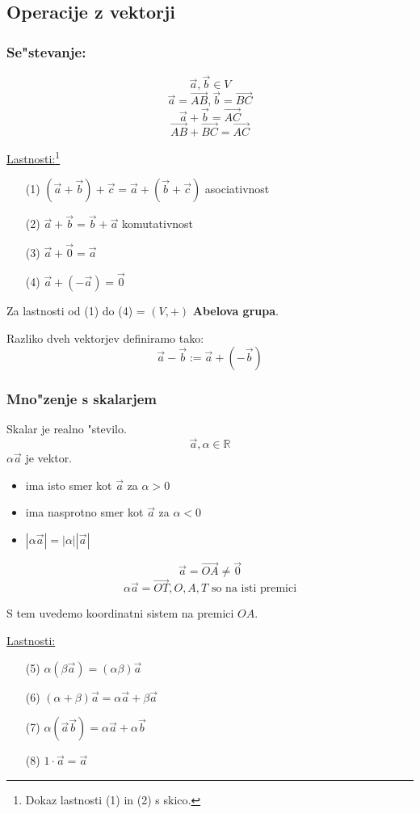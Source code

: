\subsection{Operacije z vektorji}
\subsubsection*{Se"stevanje:}
\[\vec{a}, \vec{b} \in V\]
\[\vec{a} = \vec{AB}, \vec{b} = \vec{BC}\]
\[\vec{a} + \vec{b} = \vec{AC}\]
\[\vec{AB} + \vec{BC} = \vec{AC}\]

\underline{Lastnosti:}\footnote{Dokaz lastnosti (1) in (2) s skico.}
\begin{itemize}
	\item[(1)] \((\vec{a} + \vec{b}) + \vec{c} = \vec{a} + (\vec{b} + \vec{c})\) asociativnost
	\item[(2)] \(\vec{a} + \vec{b} = \vec{b} + \vec{a}\) komutativnost
	\item[(3)] \(\vec{a} + \vec{0} = \vec{a}\)
	\item[(4)] \(\vec{a} + (-\vec{a}) = \vec{0}\)
\end{itemize}

Za lastnosti od (1) do (4) = \((V, +)\) \textbf{Abelova grupa}.

Razliko dveh vektorjev definiramo tako:
\[\vec{a} - \vec{b} := \vec{a} + (-\vec{b})\]

\subsubsection*{Mno"zenje s skalarjem}
Skalar je realno "stevilo.
\[\vec{a}, \alpha \in \mathbb{R}\]
\(\alpha \vec{a}\) je vektor.
\begin{itemize}
	\item ima isto smer kot \(\vec{a}\) za \(\alpha > 0\)
	\item ima nasprotno smer kot \(\vec{a}\) za \(\alpha < 0\)
	\item \(|\alpha \vec{a}| = |\alpha| |\vec{a}|\)
\end{itemize}

\[\vec{a} = \vec{OA} \neq \vec{0}\]
\[\alpha \vec{a} = \vec{OT}, O, A, T \text{ so na isti premici} \]

S tem uvedemo koordinatni sistem na premici \(OA\).

\underline{Lastnosti:}
\begin{itemize}
	\item[(5)] \(\alpha (\beta \vec{a}) = (\alpha \beta) \vec{a}\)
	\item[(6)] \((\alpha + \beta) \vec{a} = \alpha \vec{a} + \beta \vec{a} \)
	\item[(7)] \(\alpha(\vec{a} \vec{b}) = \alpha \vec{a} + \alpha \vec{b}\)
	\item[(8)] \(1\cdot \vec{a} = \vec{a}\)
\end{itemize}

